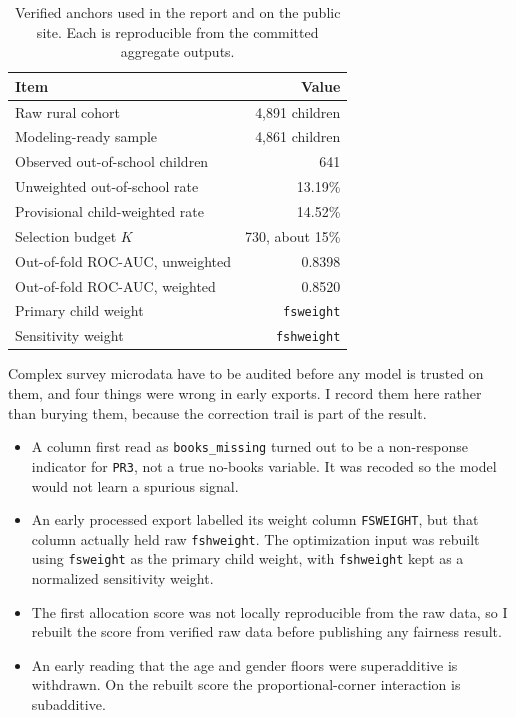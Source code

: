 \documentclass[12.1pt,a4paper]{article}
\begin{document}
\begin{table}[H]
\centering
\renewcommand{\arraystretch}{1.25}
\small
\begin{tabular}{@{}lr@{}}
\toprule
\textbf{Item} & \textbf{Value} \\
\midrule
Raw rural cohort & 4,891 children \\
Modeling-ready sample & 4,861 children \\
Observed out-of-school children & 641 \\
Unweighted out-of-school rate & 13.19\% \\
Provisional child-weighted rate & 14.52\% \\
Selection budget $K$ & 730, about 15\% \\
Out-of-fold ROC-AUC, unweighted & 0.8398 \\
Out-of-fold ROC-AUC, weighted & 0.8520 \\
Primary child weight & \texttt{fsweight} \\
Sensitivity weight & \texttt{fshweight} \\
\bottomrule
\end{tabular}
\caption{Verified anchors used in the report and on the public site. Each is reproducible from the committed aggregate outputs.}
\label{tab:anchors}
\end{table}

Complex survey microdata have to be audited before any model is trusted on them, and four things were wrong in early exports. I record them here rather than burying them, because the correction trail is part of the result.

\begin{itemize}[leftmargin=*, itemsep=3pt]
  \item A column first read as \texttt{books\_missing} turned out to be a non-response indicator for \texttt{PR3}, not a true no-books variable. It was recoded so the model would not learn a spurious signal.
  \item An early processed export labelled its weight column \texttt{FSWEIGHT}, but that column actually held raw \texttt{fshweight}. The optimization input was rebuilt using \texttt{fsweight} as the primary child weight, with \texttt{fshweight} kept as a normalized sensitivity weight.
  \item The first allocation score was not locally reproducible from the raw data, so I rebuilt the score from verified raw data before publishing any fairness result.
  \item An early reading that the age and gender floors were superadditive is withdrawn. On the rebuilt score the proportional-corner interaction is subadditive.
\end{itemize}
\end{document}
